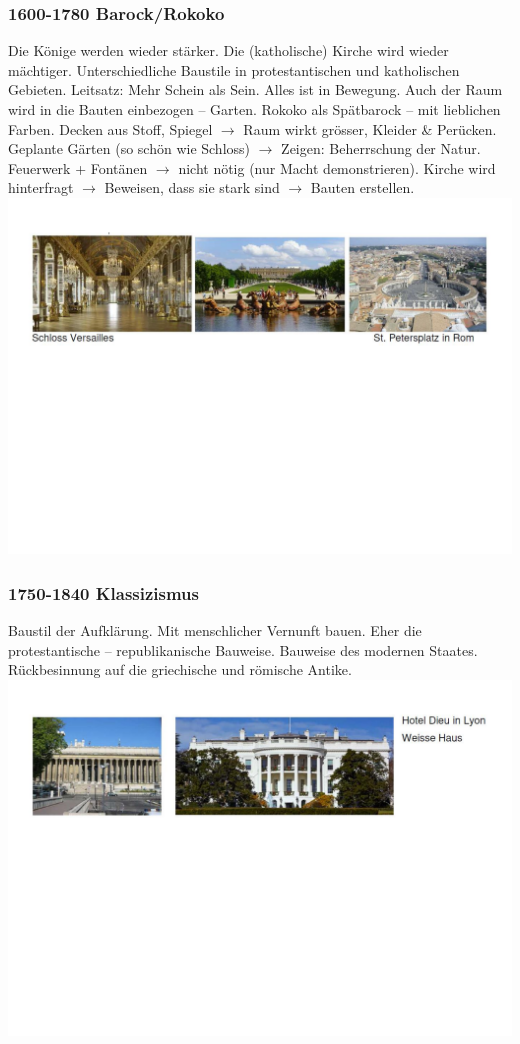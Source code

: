 \documentclass[10pt, openright=true]{scrartcl}
\begin{document}
\subsubsection{1600-1780 Barock/Rokoko}
Die Könige werden wieder stärker. Die (katholische) Kirche wird wieder mächtiger. Unterschiedliche Baustile in protestantischen und katholischen Gebieten. Leitsatz: Mehr Schein als Sein. Alles ist in Bewegung. Auch der Raum wird in die Bauten einbezogen – Garten. Rokoko als Spätbarock – mit lieblichen Farben. Decken aus Stoff, Spiegel $ \rightarrow $ Raum wirkt grösser, Kleider \& Perücken. Geplante Gärten (so schön wie Schloss) $ \rightarrow $ Zeigen: Beherrschung der Natur. Feuerwerk + Fontänen $ \rightarrow $ nicht nötig (nur Macht demonstrieren). Kirche wird hinterfragt $ \rightarrow $ Beweisen, dass sie stark sind $ \rightarrow $ Bauten erstellen. \\
\includegraphics[width=1\textwidth]{images/barock1}
\subsubsection{1750-1840 Klassizismus}
Baustil der Aufklärung. Mit menschlicher Vernunft bauen. Eher die protestantische – republikanische Bauweise. Bauweise des modernen Staates. Rückbesinnung auf die griechische und römische Antike.\\
\includegraphics[width=1\textwidth]{images/klassizismus}
\end{document}
